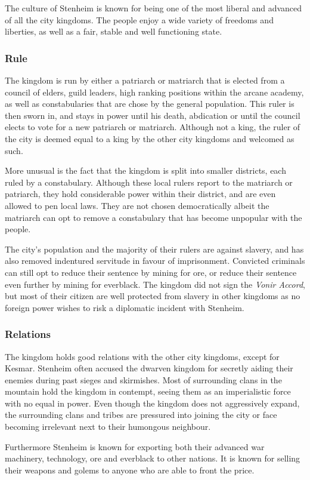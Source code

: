 The culture of Stenheim is known for being one of the most liberal and
advanced of all the city kingdoms. The people enjoy a wide variety of freedoms
and liberties, as well as a fair, stable and well functioning state.

\subsubsection{Rule}

The kingdom is run by either a patriarch or matriarch that is elected from a
council of elders, guild leaders, high ranking positions within the arcane
academy, as well as constabularies that are chose by the general
population. This ruler is then sworn in, and stays in power until his death,
abdication or until the council elects to vote for a new patriarch or
matriarch. Although not a king, the ruler of the city is deemed equal to a
king by the other city kingdoms and welcomed as such.

More unusual is the fact that the kingdom is split into smaller districts,
each ruled by a constabulary. Although these local rulers report to the
matriarch or patriarch, they hold considerable power within their district,
and are even allowed to pen local laws. They are not chosen democratically
albeit the matriarch can opt to remove a constabulary that has become
unpopular with the people.

The city's population and the majority of their rulers are against slavery,
and has also removed indentured servitude in favour of imprisonment. Convicted
criminals can still opt to reduce their sentence by mining for ore, or reduce
their sentence even further by mining for everblack. The kingdom did not sign
the \emph{Vonir Accord}, but most of their citizen are well protected from
slavery in other kingdoms as no foreign power wishes to risk a diplomatic
incident with Stenheim.

\subsubsection{Relations}

The kingdom holds good relations with the other city kingdoms, except for
Kesmar. Stenheim often accused the dwarven kingdom for secretly aiding their
enemies during past sieges and skirmishes. Most of surrounding clans in the
mountain hold the kingdom in contempt, seeing them as an imperialistic force
with no equal in power. Even though the kingdom does not aggressively expand,
the surrounding clans and tribes are pressured into joining the city or face
becoming irrelevant next to their humongous neighbour.

Furthermore Stenheim is known for exporting both their advanced war machinery,
technology, ore and everblack to other nations. It is known for selling their
weapons and golems to anyone who are able to front the price.

